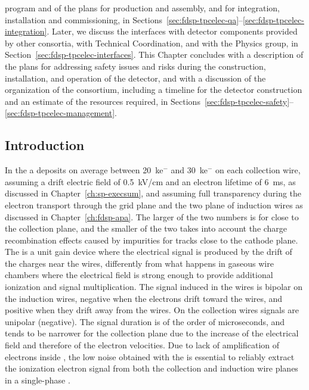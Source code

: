 program and of the plans for production and assembly, and for integration,
installation and commissioning, in 
Sections~\ref{sec:fdsp-tpcelec-qa}--\ref{sec:fdsp-tpcelec-integration}. 
Later, we discuss the interfaces with detector components provided by 
other consortia, with Technical Coordination, and with the Physics group, 
in Section~\ref{sec:fdsp-tpcelec-interfaces}. This Chapter concludes with a description
of the plans for addressing safety issues and risks during the
construction, installation, and operation of the detector, and with
a discussion of the organization of the  consortium,
including a timeline for the detector construction and an estimate
of the resources required, in 
Sections~\ref{sec:fdsp-tpcelec-safety}--\ref{sec:fdsp-tpcelec-management}.

\subsection{Introduction}
\label{sec:fdsp-tpcelec-overview-intro}


In the   a  deposits on average between
\SI{20}{k}{e$^-$} and \SI{30}{k}{e$^-$} on each collection wire, assuming a drift electric field
of \SI{0.5}{kV/cm} and an electron lifetime of \SI{6}{ms}, as discussed in
Chapter~\ref{ch:sp-execsum}, and assuming full transparency during the 
electron transport through the grid plane and the two plane of induction
wires as discussed in Chapter~\ref{ch:fdsp-apa}. The larger of the two numbers 
is for  close to the collection plane, and the smaller of the two
takes into account the charge recombination effects caused by impurities for 
tracks close to the cathode plane. The    is 
a unit gain device where the electrical signal is produced by the drift of the
charges near the wires, differently from what happens in gaseous wire 
chambers where the electrical field is strong enough to provide additional
ionization and signal multiplication. The signal induced in the 
 wires is bipolar on the induction wires, negative when the
electrons drift toward the wires, and positive when they drift away from
the wires. On the collection wires signals are unipolar (negative).
The signal duration is of the order of microseconds, and tends to be narrower
for the collection plane due to the increase of the electrical field and
therefore of the electron velocities. Due to lack of amplification of 
electrons inside , the low noise obtained with the  is
essential to reliably extract the ionization electron signal from both the 
collection and induction wire planes in a single-phase  .

